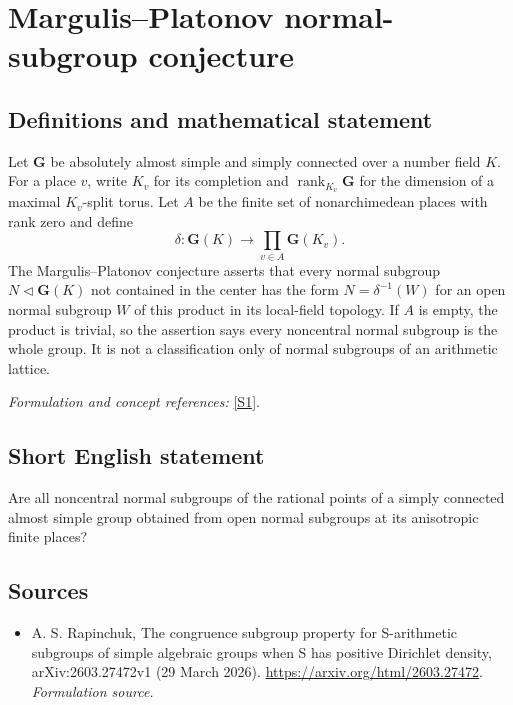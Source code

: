 \documentclass[11pt]{article}
\begin{document}
\section*{\texorpdfstring{Margulis–Platonov normal-subgroup conjecture}{Margulis–Platonov normal-subgroup conjecture}}\label{30006901}
\subsection{Definitions and mathematical statement}
Let $\mathbf G$ be absolutely almost simple and simply connected over a number field $K$. For a place $v$, write $K_v$ for its completion and $\operatorname{rank}_{K_v}\mathbf G$ for the dimension of a maximal $K_v$-split torus. Let $A$ be the finite set of nonarchimedean places with rank zero and define
\[
 \delta:\mathbf G(K)\longrightarrow\prod_{v\in A}\mathbf G(K_v).
\]
The Margulis--Platonov conjecture asserts that every normal subgroup $N\triangleleft\mathbf G(K)$ not contained in the center has the form $N=\delta^{-1}(W)$ for an open normal subgroup $W$ of this product in its local-field topology. If $A$ is empty, the product is trivial, so the assertion says every noncentral normal subgroup is the whole group. It is not a classification only of normal subgroups of an arithmetic lattice.
\par\smallskip\textit{Formulation and concept references:} \href{https://arxiv.org/html/2603.27472}{[S1]}.

\subsection{Short English statement}
Are all noncentral normal subgroups of the rational points of a simply connected almost simple group obtained from open normal subgroups at its anisotropic finite places?
\subsection{Sources}
\begin{itemize}
\item[S1]A. S. Rapinchuk, The congruence subgroup property for S-arithmetic subgroups of simple algebraic groups when S has positive Dirichlet density, arXiv:2603.27472v1 (29 March 2026).
\url{https://arxiv.org/html/2603.27472}.
\textit{Formulation source.}
\end{itemize}
\end{document}
